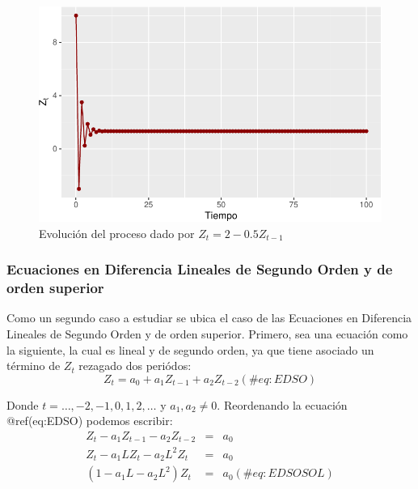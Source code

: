 \documentclass[
  a4paper,
]{article}
\begin{document}
\begin{figure}

\caption{Evolución del proceso dado por \(Z_t =2-0.5Z_{t-1}\)}

{\centering \includegraphics{index_files/figure-pdf/fig22-1.pdf}

}

\end{figure}

\hypertarget{ecuaciones-en-diferencia-lineales-de-segundo-orden-y-de-orden-superior}{%
\subsubsection{Ecuaciones en Diferencia Lineales de Segundo Orden y de
orden
superior}\label{ecuaciones-en-diferencia-lineales-de-segundo-orden-y-de-orden-superior}}

Como un segundo caso a estudiar se ubica el caso de las Ecuaciones en
Diferencia Lineales de Segundo Orden y de orden superior. Primero, sea
una ecuación como la siguiente, la cual es lineal y de segundo orden, ya
que tiene asociado un término de \(Z_t\) rezagado dos periódos: \[
    Z_t = a_0 + a_1 Z_{t-1} + a_2 Z_{t-2}
    (\#eq:EDSO)
\]

Donde \(t = \ldots, -2, -1, 0, 1, 2, \ldots\) y \(a_1, a_2 \neq 0\).
Reordenando la ecuación @ref(eq:EDSO) podemos escribir: \begin{eqnarray}
    Z_t - a_1 Z_{t-1} - a_2 Z_{t-2} & = & a_0 \nonumber \\
    Z_t - a_1 L Z_{t} - a_2 L^2 Z_{t} & = & a_0 \nonumber \\
    (1 - a_1 L - a_2 L^2)Z_t & = & a_0 
    (\#eq:EDSOSOL)
\end{eqnarray}
\end{document}
